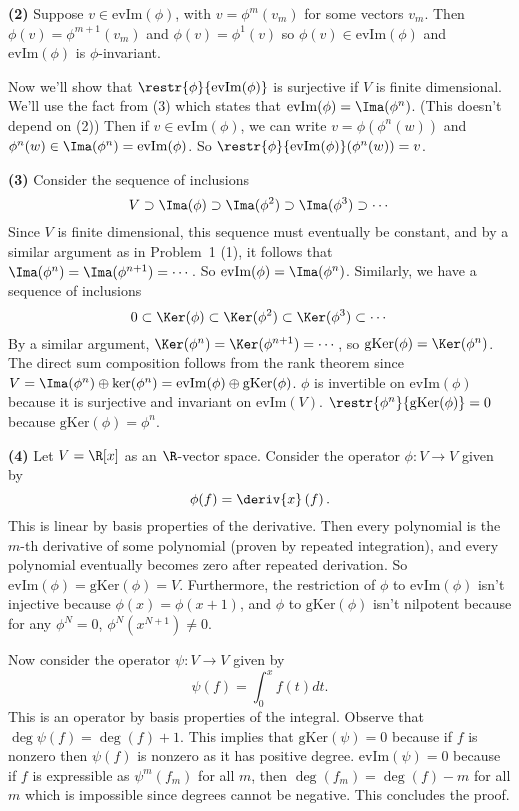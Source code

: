 \textbf{(2)} Suppose $v\in \mathrm{evIm}(\phi)$, with $v=\phi^m(v_m)$ for some vectors $v_m$. Then $\phi(v)=\phi^{m+1}(v_m)$ and $\phi(v)=\phi^1(v)$ so $\phi(v)\in \mathrm{evIm}(\phi)$ and $\mathrm{evIm}(\phi)$ is $\phi$-invariant. 

Now we'll show that $\restr{\phi}{\mathrm{evIm}(\phi)}$ is surjective if $V$ is finite dimensional. We'll use the fact from (3) which states that $\mathrm{evIm}(\phi)=\Ima(\phi^n)$. (This doesn't depend on (2)) Then if $v\in \mathrm{evIm}(\phi)$, we can write $v=\phi(\phi^n(w))$ and $\phi^n(w)\in\Ima(\phi^n)=\mathrm{evIm}(\phi)$. So $\restr{\phi}{\mathrm{evIm}(\phi)}(\phi^n(w))=v$. 

\textbf{(3)} Consider the sequence of inclusions
\[
  V \supset \Ima(\phi) \supset \Ima(\phi^2) \supset \Ima(\phi^3) \supset \cdots
\]
Since $V$ is finite dimensional, this sequence must eventually be constant, and by a similar argument as in Problem~1 (1), it follows that $\Ima(\phi^n)=\Ima(\phi^{n+1})=\cdots$. So $\textrm{evIm}(\phi)=\Ima(\phi^n)$. Similarly, we have a sequence of inclusions
\[
  {0} \subset \Ker(\phi) \subset \Ker(\phi^2) \subset \Ker(\phi^3) \subset \cdots
\]
By a similar argument, $\Ker(\phi^n)=\Ker(\phi^{n+1})=\cdots$, so $\mathrm{gKer}(\phi)=\Ker(\phi^n)$. The direct sum composition follows from the rank theorem since $V=\Ima(\phi^n)\oplus\ker(\phi^n)=\mathrm{evIm}(\phi)\oplus \mathrm{gKer}(\phi)$. $\phi$ is invertible on $\mathrm{evIm}(\phi)$ because it is surjective and invariant on $\textrm{evIm}(V)$. $\restr{\phi^n}{\mathrm{gKer}(\phi)}=0$ because $\mathrm{gKer}(\phi)=\phi^n$.

\textbf{(4)} Let $V=\R[x]$ as an $\R$-vector space. Consider the operator $\phi : V \to V$ given by
\[
  \phi(f)=\deriv{x}\left(f\right)
.\]  
This is linear by basis properties of the derivative. Then every polynomial is the $m$-th derivative of some polynomial (proven by repeated integration), and every polynomial eventually becomes zero after repeated derivation. So $\mathrm{evIm}(\phi)=\mathrm{gKer}(\phi)=V$. Furthermore, the restriction of $\phi$ to $\mathrm{evIm}(\phi)$ isn't injective because $\phi(x)=\phi(x+1)$, and $\phi$ to $\mathrm{gKer}(\phi)$ isn't nilpotent because for any $\phi^N=0$, $\phi^N(x^{N+1})\neq 0$.        

Now consider the operator $\psi : V \to V$ given by 
\[
  \psi(f)=\int^x_0f(t)dt
.\]
This is an operator by basis properties of the integral. Observe that $\deg \psi(f) = \deg(f)+1$. This implies that $\mathrm{gKer}(\psi)=0$ because if $f$ is nonzero then $\psi(f)$ is nonzero as it has positive degree. $\mathrm{evIm}(\psi)=0$ because if $f$ is expressible as $\psi^m(f_m)$ for all $m$, then $\deg(f_m)=\deg(f) - m$ for all $m$ which is impossible since degrees cannot be negative. This concludes the proof.        
